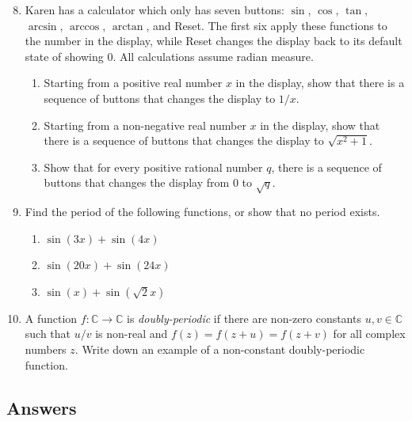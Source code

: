 \begin{enumerate}\setcounter{enumi}{7}
\item Karen has a calculator which only has seven buttons: $\sin$, $\cos$, $\tan$, $\arcsin$, $\arccos$, $\arctan$, and Reset. The first six apply these functions to the number in the display, while Reset changes the display back to its default state of showing 0. All calculations assume radian measure.
\begin{enumerate}
\item Starting from a positive real number $x$ in the display, show that there is a sequence of buttons that changes the display to $1/x$.
\item Starting from a non-negative real number $x$ in the display, show that there is a sequence of buttons that changes the display to $\sqrt{x^2 + 1}$.
\item Show that for every positive rational number $q$, there is a sequence of buttons that changes the display from $0$ to $\sqrt{q}$.
\end{enumerate}
\item Find the period of the following functions, or show that no period exists.
\begin{enumerate}
\item $\sin(3x) + \sin(4x)$
\item $\sin(20x) + \sin(24x)$
\item $\sin(x) + \sin(\sqrt{2}x)$
\end{enumerate}
\item A function $f:\mathbb{C}\to\mathbb{C}$ is \emph{doubly-periodic} if there are non-zero constants $u,v\in\mathbb{C}$ such that $u/v$ is non-real and $f(z) = f(z + u) = f(z + v)$ for all complex numbers $z$. Write down an example of a non-constant doubly-periodic function.
\end{enumerate}


\newpage
\subsection{Answers}

